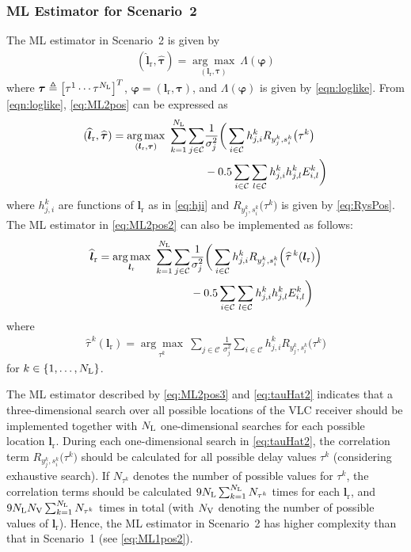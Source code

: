 \documentclass[10pt,twocolumn]{IEEEtran}
\newcommand{\NL}{N_{\rm{L}}}
\newcommand{\NV}{N_{\rm{V}}}
\newcommand{\bvp}{{\boldsymbol{\varphi}}}
\newcommand{\mtC}{{\mathcal{C}}}
\newcommand{\lr}{{\boldsymbol{l}_{\mathrm{r}}}}
\newcommand{\lrh}{{\widehat{\boldsymbol{l}}_{\mathrm{r}}}}
\newcommand{\btau}{{\boldsymbol{\tau}}}
\newcommand{\btauh}{\widehat{{\boldsymbol{\tau}}}}
\begin{document}
\subsubsection{ML Estimator for Scenario~2}\label{sec:ML2pos}

The ML estimator in Scenario~2 is given by
\begin{gather}\label{eq:ML2pos}
(\lrh,\btauh)=\underset{(\lr,\btau)}{\arg\max}~\Lambda(\bvp)
\end{gather}
where $\btau\triangleq\big[\tau^1\cdots\tau^{\NL}\big]^T$, $\bvp=(\lr,\btau)$, and $\Lambda(\bvp)$ is given by \eqref{eqn:loglike}. From \eqref{eqn:loglike}, \eqref{eq:ML2pos} can be expressed as
\begin{align}\nonumber
(\lrh,\btauh)=\underset{(\lr,\btau)}{\arg\max}~\sum_{k=1}^{\NL}\sum_{j\in{\mtC}}
&\frac{1}{\sigma_j^2}
\bigg(
\sum_{i\in{\mtC}}h^k_{j,i}R_{y^k_j,s^k_i}\big(\tau^k\big)
\\\label{eq:ML2pos2}
&-0.5\sum_{i\in{\mtC}}\sum_{l\in{\mtC}}h^k_{j,i}h^k_{j,l}E^k_{i,l}
\bigg)
\end{align}
where $h^k_{j,i}$ are functions of $\lr$ as in \eqref{eq:hji} and $R_{y^k_j,s^k_i}\big(\tau^k\big)$ is given by \eqref{eq:RysPos}. The ML estimator in \eqref{eq:ML2pos2} can also be implemented as follows:
\begin{align}\nonumber
\lrh=\underset{\lr}{\arg\max}~\sum_{k=1}^{\NL}\sum_{j\in{\mtC}}&\frac{1}{\sigma_j^2}
\bigg(
\sum_{i\in{\mtC}}h^k_{j,i}R_{y^k_j,s^k_i}\Big(\widehat{\tau}^{\,k}(\lr)\Big)
\\\label{eq:ML2pos3}
&-0.5\sum_{i\in{\mtC}}\sum_{l\in{\mtC}}h^k_{j,i}h^k_{j,l}E^k_{i,l}
\bigg)
\end{align}
where
\begin{gather}\label{eq:tauHat2}
\widehat{\tau}^{\,k}(\lr)=\underset{\tau^k}{\arg\max}~\sum_{j\in{\mtC}}\frac{1}{\sigma_j^2}
\sum_{i\in{\mtC}}h^k_{j,i}R_{y^k_j,s^k_i}\big(\tau^k\big)
\end{gather}
for $k\in\{1,\ldots,\NL\}$.

The ML estimator described by \eqref{eq:ML2pos3} and \eqref{eq:tauHat2} indicates that a three-dimensional search over all possible locations of the VLC receiver should be implemented together with $\NL$ one-dimensional searches for each possible location $\lr$. During each one-dimensional search in \eqref{eq:tauHat2}, the correlation term $R_{y^k_j,s^k_i}\big(\tau^k\big)$ should be calculated for all possible delay values $\tau^k$ (considering exhaustive search). If $N_{\tau^k}$ denotes the number of possible values for $\tau^k$, the correlation terms should be calculated $9\NL\sum_{k=1}^{\NL}N_{\tau^k}$ times for each $\lr$, and $9\NL\NV\sum_{k=1}^{\NL}N_{\tau^k}$ times in total (with $\NV$ denoting the number of possible values of $\lr$). Hence, the ML estimator in Scenario~2 has higher complexity than that in Scenario~1 (see \eqref{eq:ML1pos2}).
\end{document}
